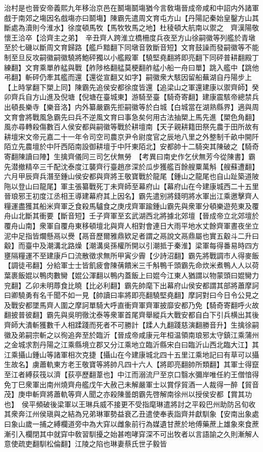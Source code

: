 治村是也晉安帝義熙九年移治京邑在鬭塲鬬塲猶今言敎塲晉成帝咸和中詔内外諸軍戲于南郊之塲因名戲塲亦曰鬬塲】陳霸先遣周文育屯方山【丹陽記秦始皇鑿方山其斷處為瀆則今淮水】徐度頓馬牧【馬牧牧馬之地】杜稜頓大航南以禦之　齊漢陽敬懷王洽卒【洽齊主之弟】　辛丑齊人跨淮立橋柵度兵夜至方山徐嗣徽等列艦於青墩至於七磯以斷周文育歸路【艦戶黯翻下同墩音敦斷音短】文育鼓譟而發嗣徽等不能制至旦反攻嗣徽嗣徽驍將鮑砰獨以小艦殿軍【驍堅堯翻將即亮翻下同砰普耕翻殿丁練翻】文育乘單舴艋與戰【舴陟格翻艋莫梗翻舴艋小船一舟曰單】跳入艦中【跳他弔翻】斬砰仍牽其艦而還【還從宣翻又如字】嗣徽衆大駭因留船蕪湖自丹陽步上【上時掌翻下槊上同】陳霸先追侯安都徐度皆還【追梁山之軍還建康以禦齊師】癸卯齊兵自方山進及倪塘【倪塘在臺城東】游騎至臺【騎奇寄翻】建康震駭帝總禁兵出頓長樂寺【樂音洛】内外纂嚴霸先拒嗣徽等於白城【白城當在湖熟縣界】適與周文育會將戰風急霸先曰兵不逆風文育曰事急矣何用古法抽槊上馬先進【槊色角翻】風亦尋轉殺傷數百人侯安都與嗣徽等戰於耕壇南【天子親耕籍田祭先農于田所故有耕壇宋文帝元嘉二十一年令司空司農京尹令尉度官之辰地八里之外整制千畝中開阡陌立先農壇於中阡西陌南設御耕壇于中阡東陌北】安都帥十二騎突其陳破之【騎奇寄翻陳讀曰陣】生擒齊儀同三司乞伏無勞　【考異曰南史作乞伏無芳今從陳書】霸先潜撤精卒三千配沈泰度江襲齊行臺趙彦深於瓜步獲艦百餘艘粟萬斛【艘蘇遭翻】六月甲辰齊兵潛至鍾山侯安都與齊將王敬寶戰於龍尾【鍾山之龍尾也自山趾築道陂陁以登山曰龍尾】軍主張纂戰死丁未齊師至幕府山【幕府山在今建康城西二十五里晉琅邪王初度江丞相王導建幕府其上因名】霸先遣别將錢明將水軍出江乘邀擊齊人糧運盡獲其船米齊軍乏食殺馬驢食之庚戌齊軍踰鍾山霸先與衆軍分頓樂遊苑東及覆舟山北斷其衝要【斷音短】壬子齊軍至玄武湖西北將據北郊壇【晉成帝立北郊壇於覆舟山南】衆軍自覆舟東移頓壇北與齊人相對會連日大雨平地水丈餘齊軍晝夜坐立泥中足指皆爛懸鬲以㸑【鬲音歷爾雅鼎欵足者謂之鬲說文鬲鼎屬也實五觳斗二升曰觳】而臺中及潮溝北路燥【潮溝吳孫權所開以引潮抵于秦淮】梁軍每得番易時四方壅隔糧運不至建康戶口流散徵求無所甲寅少霽【少詩沼翻】霸先將戰調市人得麥飯【調徒弔翻】分給軍士士皆飢疲會陳蒨饋米三千斛鴨千頭霸先命炊米煮鴨人人以荷葉裹飯婫以鴨肉數臠【婫公渾翻以鴨内蓋飯上曰婫今江東人猶謂以物蒙頭曰婫臠力兖翻】乙卯未明蓐食比曉【比必利翻】霸先帥麾下出幕府山侯安都謂其部將蕭摩訶曰卿驍勇有名千聞不如一見【帥讀曰率將即亮翻驍堅堯翻】摩訶對曰今日令公見之及戰安都墜馬齊人圍之摩訶單騎大呼直衝齊軍齊軍披靡安都乃免【騎奇寄翻呼火故翻披普彼翻】霸先與吳明徹沈泰等衆軍首尾齊舉縱兵大戰安都自白下引兵横出其後齊師大潰斬獲數千人相蹂踐而死者不可勝計【蹂人九翻踐慈演翻勝音升】生擒徐嗣徽及弟嗣宗斬之以徇追奔至於臨沂【晉成帝咸康元年桓温領南琅邪太守鎮江乘蒲州之金城求割丹陽之江乘縣境立郡又分江乘地立臨沂縣宋白曰臨沂山西北臨大江】其江乘攝山鍾山等諸軍相次克捷【攝山在今建康城北四十五里江乘地記曰有草可以攝生故名】虜蕭軌東方老王敬寶等將帥凡四十六人【將即亮翻帥所類翻】其軍士得竄至江者縛荻筏以濟【荻亭歷翻葦也】中江而溺流尸至京口翳水彌岸唯任約王僧愔得免丁巳衆軍出南州燒齊舟艦戊午大赦己未解嚴軍士以賞俘貿酒一人裁得一醉【貿音茂】庚申斬齊將蕭軌等齊人聞之亦殺陳曇朗霸先啓解南徐州以授侯安都【賞其功也】　侯平頻破後梁軍以王琳兵威不接更不受指麾琳遣將討之平殺巴州助防呂旬收其衆奔江州侯瑱與之結為兄弟琳軍勢益衰乙丑遣使奉表詣齊并獻馴象【安南出象處曰象山歲一捕之縛欄道旁中為大穽以雌象前行為媒遺甘蔗於地傅藥蔗上雄象來食蔗漸引入欄閉其中就穽中敎習馴擾之始甚咆哮穽深不可出牧者以言語諭之久則漸解人意使疏吏翻馴松倫翻】江陵之陷也琳妻蔡氏世子毅皆